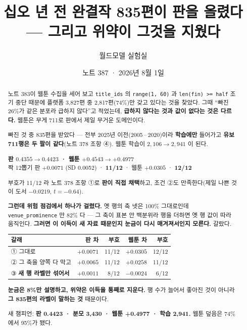 \documentclass[11pt]{article}
\begin{document}
\title{십오 년 전 완결작 835편이 판을 올렸다 --- 그리고 위약이 그것을 지웠다}
\author{월드모델 실험실}
\date{노트 387 · 2026년 8월 1일}
\maketitle

\begin{abstract}
노트 383이 웹툰 수집을 세어 보고 \texttt{title\_ids} 의
\texttt{range(1, 60)} 과 \texttt{len(fin) >= half} 조기 중단 때문에 플랫폼
3,827편 중 2,817편(74\%)만 갖고 있다는 것을 찾았다. 그때 ``빠진 26\%가
같은 분포라 급하지 않다''고 적었는데, \textbf{급하지 않다는 것과 값이
없다는 것은 다르다.} 웹툰은 무게 711로 판에서 제일 무거운 도메인이다.

빠진 것 중 835편을 받았다 --- 전부 2025년 이전(2005\,--\,2020)이라
\textbf{학습에만} 들어가고 \textbf{유보 711행은 두 팔이 같다}(노트 378
조항 ④). 웹툰 학습이 $2{,}106 \to 2{,}941$ 이 된다.

\begin{center}
\textbf{판 $0.4355 \to 0.4423$ · 웹툰 $+0.4543 \to +0.4977$} \\
짝 12뽑기 판 $\mathbf{+0.0071}$ (SD 0.0052) · \textbf{11/12} · 웹툰
$+0.0305$ · \textbf{12/12}
\end{center}

부호가 11/12 라 노트 378 조항 ①로 \textbf{판이 직접 채택}하고, 조건 ②도
만족한다(제일 나쁜 것이 도서 $-0.0219$, $t=-0.64$).

\textbf{그런데 위험 점검에서 하나가 걸렸다.} 옛 행의 축 넷은 100\% 그대로인데
\texttt{venue\_prominence} 만 82\% 다 --- 그 축이 표본 안 백분위라 행을
더하면 옛 행 값이 따라 움직인다. \textbf{그러면 이 이득이 새 자료 때문인지
눈금이 다시 매겨져서인지 모른다.} 갈랐다.

\begin{center}
\begin{tabular}{lrrrr}
\hline
갈래 & 판 차 & 부호 & 웹툰 차 & 부호 \\
\hline
① 그대로 & $+0.0071$ & 11/12 & $+0.0305$ & 12/12 \\
② 그 축을 양쪽 다 막고 & $+0.0065$ & 11/12 & $+0.0258$ & 11/12 \\
③ \textbf{새 행 라벨만 섞어서} & $+0.0011$ & 8/12 & $\mathbf{-0.0024}$ & 6/12 \\
\hline
\end{tabular}
\end{center}

\textbf{눈금은 8\%만 설명하고, 위약은 이득을 통째로 지운다.} 행 수가 늘어서
좋아진 것이 아니라 \textbf{그 835편의 라벨이 말하는 것} 때문이다.

새 챔피언: \textbf{판 0.4423 · 분모 3,430 · 웹툰 +0.4977 · 학습 2,941.}
웹툰 덮음은 74\%에서 95\%가 됐다.
\end{abstract}
\end{document}
